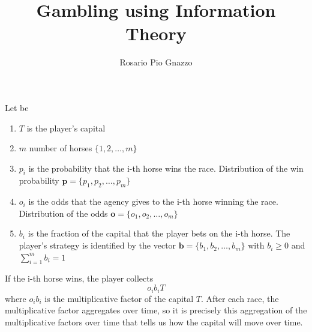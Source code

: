 \documentclass{article}
\title{Gambling using Information Theory}
\author{Rosario Pio Gnazzo}
\begin{document}
\maketitle
\noindent Let be
\begin{enumerate}
    \item $T$ is the player's capital
    \item $m$ number of horses $\{1, 2, \dots, m\}$
    \item $p_i$ is the probability that the i-th horse wins the race. Distribution of the win probability $\mathbf{p} = \{p_1, p_2, \dots, p_m\}$
    \item $o_i$ is the odds that the agency gives to the i-th horse winning the race. Distribution of the odds $\mathbf{o} = \{o_1, o_2, \dots, o_m\}$
    \item $b_i$ is the fraction of the capital that the player bets on the i-th horse. The player's strategy is identified by the vector $\mathbf{b} = \{b_1, b_2, \dots, b_m\}$ with $b_i\ge 0$ and $\sum_{i=1}^{m}b_i = 1$
\end{enumerate}
If the i-th horse wins, the player collects
\begin{equation}
    o_i b_iT
\end{equation}
where $o_ib_i$ is the multiplicative factor of the capital $T$.
After each race, the multiplicative factor aggregates over time, so it is precisely this aggregation of the multiplicative factors over time that tells us how the capital will move over time.
\end{document}
